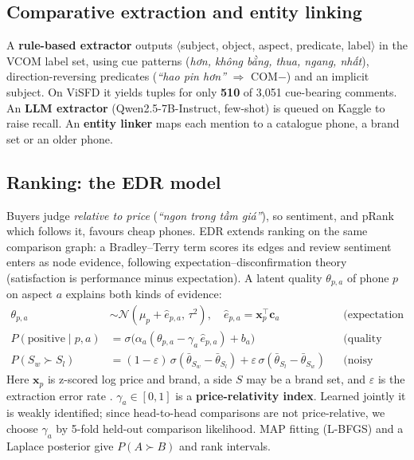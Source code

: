 \documentclass{article}
\begin{document}
\subsection{Comparative extraction and entity linking}
A \textbf{rule-based extractor} outputs $\langle$subject, object, aspect, predicate, label$\rangle$ in the VCOM label set, using cue patterns
(\emph{hơn, không bằng, thua, ngang, nhất}), direction-reversing predicates (\emph{``hao pin hơn''} $\Rightarrow$ COM$-$) and an implicit subject.
On ViSFD it yields tuples for only \textbf{510} of 3{,}051 cue-bearing comments. An \textbf{LLM extractor} (Qwen2.5-7B-Instruct, few-shot)
is queued on Kaggle to raise recall. An \textbf{entity linker} maps each mention to a catalogue phone, a brand set or an older phone.

\subsection{Ranking: the EDR model}
Buyers judge \emph{relative to price} (\emph{``ngon trong tầm giá''}), so sentiment, and pRank which follows it, favours cheap phones.
EDR extends ranking on the same comparison graph: a Bradley--Terry term scores its edges and review sentiment enters as node evidence,
following expectation--disconfirmation theory \citep{oliver1980} (satisfaction is performance minus expectation).
A latent quality $\theta_{p,a}$ of phone $p$ on aspect $a$ explains both kinds of evidence:
\begin{align*}
\theta_{p,a} &\sim \mathcal N(\mu_p+\hat e_{p,a},\,\tau^2),\quad \hat e_{p,a}=\mathbf{x}_p^{\top}\mathbf{c}_a && \text{(expectation from price, brand)}\\
P(\text{positive}\mid p,a) &= \sigma\big(\alpha_a(\theta_{p,a}-\gamma_a\,\hat e_{p,a})+b_a\big) && \text{(quality minus expectation)}\\
P(S_w\succ S_l) &= (1-\varepsilon)\,\sigma(\bar\theta_{S_w}-\bar\theta_{S_l})+\varepsilon\,\sigma(\bar\theta_{S_l}-\bar\theta_{S_w}) && \text{(noisy Bradley--Terry)}
\end{align*}
Here $\mathbf{x}_p$ is z-scored log price and brand, a side $S$ may be a brand set, and $\varepsilon$ is the extraction error rate \citep{bt1952}.
$\gamma_a\in[0,1]$ is a \textbf{price-relativity index}. Learned jointly it is weakly identified; since head-to-head comparisons are not
price-relative, we choose $\gamma_a$ by 5-fold held-out comparison likelihood.
MAP fitting (L-BFGS) and a Laplace posterior give $P(A\succ B)$ and rank intervals.
\end{document}
